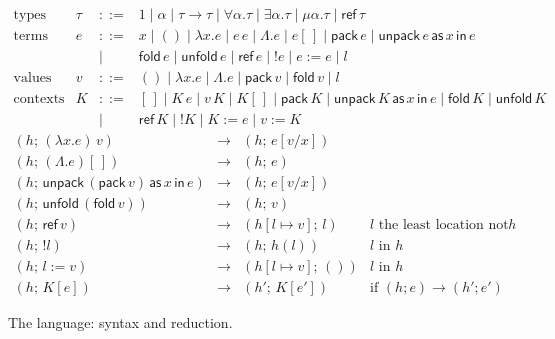 \documentclass[acmsmall,nonacm,screen]{acmart}
\newcommand{\kw}[1]{\mathsf{#1}}
\begin{document}
\begin{figure}
\small
\[
\begin{array}{llcl}
\text{types} & \tau & ::= & 1 \mid \alpha \mid \tau \to \tau \mid \forall\alpha.\tau \mid
   \exists\alpha.\tau \mid \mu\alpha.\tau \mid \kw{ref}\,\tau \\
\text{terms} & e & ::= & x \mid () \mid \lambda x.e \mid e\,e \mid \Lambda.e \mid e[\,] \mid
   \kw{pack}\,e \mid \kw{unpack}\,e\,\kw{as}\,x\,\kw{in}\,e \\
 & & \mid & \kw{fold}\,e \mid \kw{unfold}\,e \mid \kw{ref}\,e \mid {!e} \mid e := e \mid l \\
\text{values} & v & ::= & () \mid \lambda x.e \mid \Lambda.e \mid \kw{pack}\,v \mid
   \kw{fold}\,v \mid l \\
\text{contexts} & K & ::= & [\,] \mid K\,e \mid v\,K \mid K[\,] \mid \kw{pack}\,K \mid
   \kw{unpack}\,K\,\kw{as}\,x\,\kw{in}\,e \mid \kw{fold}\,K \mid \kw{unfold}\,K \\
 & & \mid & \kw{ref}\,K \mid {!K} \mid K := e \mid v := K
\end{array}
\]
\[
\begin{array}{rcll}
(h;\,(\lambda x.e)\,v) & \longrightarrow & (h;\,e[v/x]) \\
(h;\,(\Lambda.e)[\,]) & \longrightarrow & (h;\,e) \\
(h;\,\kw{unpack}\,(\kw{pack}\,v)\,\kw{as}\,x\,\kw{in}\,e) & \longrightarrow & (h;\,e[v/x]) \\
(h;\,\kw{unfold}\,(\kw{fold}\,v)) & \longrightarrow & (h;\,v) \\
(h;\,\kw{ref}\,v) & \longrightarrow & (h[l \mapsto v];\,l) & l \text{ the least location not in } h \\
(h;\,{!l}) & \longrightarrow & (h;\,h(l)) & l \text{ in } h \\
(h;\,l := v) & \longrightarrow & (h[l \mapsto v];\,()) & l \text{ in } h \\
(h;\,K[e]) & \longrightarrow & (h';\,K[e']) & \text{if } (h;e) \longrightarrow (h';e')
\end{array}
\]
\caption{The language: syntax and reduction.}
\label{fig:lang}
\end{figure}
\end{document}
